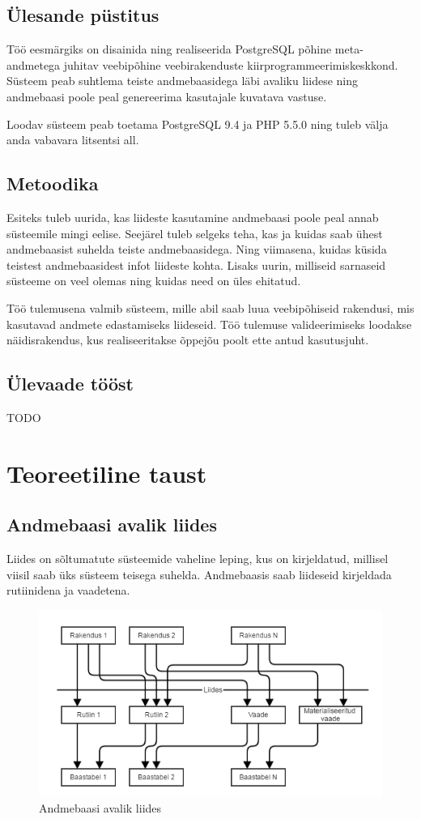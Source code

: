 \documentclass[a4paper,12pt]{article} %
\begin{document}
\subsection{Ülesande püstitus}
Töö eesmärgiks on disainida ning realiseerida PostgreSQL põhine meta-andmetega juhitav veebipõhine veebirakenduste kiirprogrammeerimiskeskkond. Süsteem peab suhtlema teiste andmebaasidega läbi avaliku liidese ning andmebaasi poole peal genereerima kasutajale kuvatava vastuse.\par
Loodav süsteem peab toetama PostgreSQL 9.4 ja PHP 5.5.0 ning tuleb välja anda vabavara litsentsi all.
\subsection{Metoodika}
Esiteks tuleb uurida, kas liideste kasutamine andmebaasi poole peal annab süsteemile mingi eelise. Seejärel tuleb selgeks teha, kas ja kuidas saab ühest andmebaasist suhelda teiste andmebaasidega. Ning viimasena, kuidas küsida teistest andmebaasidest infot liideste kohta.
Lisaks uurin, milliseid sarnaseid süsteeme on veel olemas ning kuidas need on üles ehitatud.\par
Töö tulemusena valmib süsteem, mille abil saab luua veebipõhiseid rakendusi, mis kasutavad andmete edastamiseks liideseid. Töö tulemuse valideerimiseks loodakse näidisrakendus, kus realiseeritakse õppejõu poolt ette antud kasutusjuht.
\subsection{Ülevaade tööst}
TODO
\pagebreak

\section{Teoreetiline taust}
\subsection{Andmebaasi avalik liides}
\label{andmebaasi_avalik_liides}
Liides on sõltumatute süsteemide vaheline leping, kus on kirjeldatud, millisel viisil saab üks süsteem teisega suhelda.
Andmebaasis saab liideseid kirjeldada rutiinidena ja vaadetena.

\begin{figure}[H]
\begin{center}
\includegraphics[bb=0 0 606 330,scale=0.6]{./diagrams/db-interface.png}
\caption{Andmebaasi avalik liides}
\end{center}
\end{figure}
\end{document}
